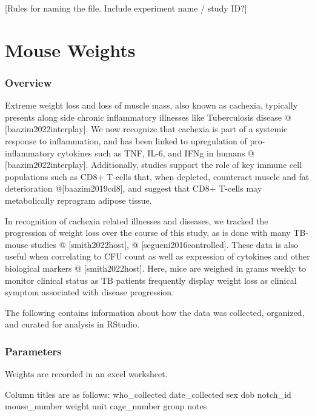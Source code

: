 \documentclass[
]{book}
\begin{document}
{[}Rules for naming the file. Include experiment name / study ID?{]}

\hypertarget{mouse-weights}{%
\chapter{Mouse Weights}\label{mouse-weights}}

\hypertarget{overview-1}{%
\subsection{Overview}\label{overview-1}}

Extreme weight loss and loss of muscle mass, also known as cachexia, typically presents along side chronic inflammatory illnesses like Tuberculosis disease @ {[}baazim2022interplay{]}. We now recognize that cachexia is part of a systemic response to inflammation, and has been linked to upregulation of pro-inflammatory cytokines such as TNF, IL-6, and IFNg in humans @ {[}baazim2022interplay{]}. Additionally, studies support the role of key immune cell populations such as CD8+ T-cells that, when depleted, counteract muscle and fat deterioration @{[}baazim2019cd8{]}, and suggest that CD8+ T-cells may metabolically reprogram adipose tissue.

In recognition of cachexia related illnesses and diseases, we tracked the progression of weight loss over the course of this study, as is done with many TB-mouse studies @ {[}smith2022host{]}, @ {[}segueni2016controlled{]}. These data is also useful when correlating to CFU count as well as expression of cytokines and other biological markers @ {[}smith2022host{]}. Here, mice are weighed in grams weekly to monitor clinical status as TB patients frequently display weight loss as clinical symptom associated with disease progression.

The following contains information about how the data was collected, organized, and curated for analysis in RStudio.

\hypertarget{parameters}{%
\subsection{Parameters}\label{parameters}}

Weights are recorded in an excel worksheet.

Column titles are as follows: who\_collected date\_collected sex dob notch\_id mouse\_number weight unit cage\_number group notes
\end{document}
